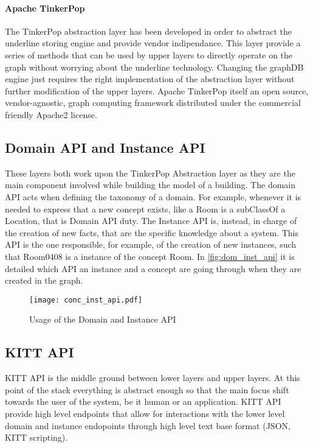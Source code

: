 \paragraph{Apache TinkerPop}
The TinkerPop abstraction layer has been developed in order to abstract the underline storing engine and provide vendor indipendance. This layer provide a series of methods that can be used by upper layers to directly operate on the graph without worrying about the underline technology. Changing the graphDB engine just requires the right implementation of the abstraction layer without further modification of the upper layers. Apache TinkerPop itself  an open source, vendor-agnostic, graph computing framework distributed under the commercial friendly Apache2 license.

\subsection{Domain API and Instance API}
These layers both work upon the TinkerPop Abstraction layer as they are the main component involved while building the model of a building. The domain API acts when defining the taxonomy of a domain. For example, whenever it is needed to express that a new concept exists, like a Room is a subClassOf a Location, that is Domain API duty. The Instance API is, instead, in charge of the creation of new facts, that are the specific knowledge about a system. This API is the one responsible, for example, of the creation of new instances, such that Room0408 is a instance of the concept Room. In \autoref{fig:dom_inst_api} it is detailed which API an instance and a concept are going through when they are created in the graph.
\begin{figure}
  \centering
  \texttt{[image: conc\_inst\_api.pdf]}
  \caption{Usage of the Domain and Instance API}
  \label{fig:dom_inst_api}
\end{figure}

\subsection{KITT API}
KITT API is the middle ground between lower layers and upper layers. At this point of the stack everything is abstract enough so that the main focus shift towards the user of the system, be it human or an application. KITT API provide high level endpoints that allow for interactions with the lower level domain and instance endopoints through high level text base format (JSON, KITT scripting).

